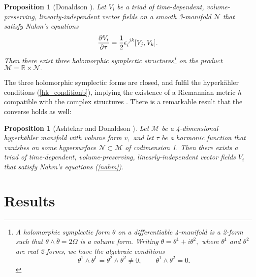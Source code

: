 \documentclass[a4paper,12pt, onecolumn, notitlepage]{article}
\newtheorem{prop}[thm]{Proposition}
\theoremstyle{definition}
\theoremstyle{remark}
\newcommand{\e}{\epsilon}
\newcommand{\ddt}[1]{\frac{\partial #1}{\partial \tau}}
\newcommand{\HK}{hyperk\"ahler }
\newcommand{\R}{\mathbb{R}}
\begin{document}
\begin{prop}[Donaldson \cite{donaldson}]
	Let $V_{i}$ be a triad of time-dependent, volume-preserving, linearly-independent vector fields on a smooth 3-manifold $\mathcal{N}$ that satisfy Nahm's equations
	$$\ddt{V_{i}} = \frac{1}{2}\e\indices{_i^j^k}[V_{j},V_{k}].
	$$
	Then there exist three holomorphic symplectic structures\footnote{A holomorphic symplectic form $\theta$ on a differentiable 4-manifold is a 2-form such that $\theta\wedge\bar{\theta}=2\Omega$ is a volume form. Writing $\theta = \theta^{1} + i\theta^{2},$ where $\theta^{1}$ and $\theta^{2}$ are real 2-forms, we have the algebraic conditions
		\begin{equation*}
		\theta^{1}\wedge\theta^{1}=\theta^{2}\wedge\theta^{2}\neq 0,\qquad \theta^{1}\wedge \theta^{2}=0.
		\end{equation*}}
	 on the product $\mathcal{M}=\R\times\mathcal{N}.$ 
\end{prop}
The three holomorphic symplectic forms are closed, and fulfil the \HK conditions (\ref{hk_conditionb}), implying the existence of a Riemannian metric $h$ compatible with the complex structures \cite{donaldson}. There is a remarkable result that the converse holds as well:\\

\begin{prop}[Ashtekar \cite{ashtekar_1988} and Donaldson \cite{donaldson}]
	Let $\mathcal{M}$ be a 4-dimensional \HK manifold with volume form $v,$ and let $\tau$ be a harmonic function that vanishes on some hypersurface $\mathcal{N}\subset\mathcal{M}$ of codimension 1. Then there exists a triad of time-dependent, volume-preserving, linearly-independent vector fields $V_{i}$ that satisfy Nahm's equations (\ref{nahm}).
\end{prop}

\section{Results}
\end{document}
